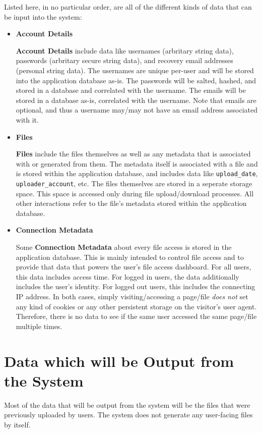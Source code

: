 \documentclass[12pt,a4paper]{report}
\begin{document}
Listed here, in no particular order, are all of the different kinds of data that can be input into the system:
\begin{itemize}
	\item \textbf{Account Details}

	      \textbf{Account Details} include data like usernames (arbritary string data), passwords (arbritary secure string data), and recovery email addresses (personal string data). The usernames are unique per-user and will be stored into the application database as-is. The passwords will be salted, hashed, and stored in a database and correlated with the username. The emails will be stored in a database as-is, correlated with the username. Note that emails are optional, and thus a username may/may not have an email address associated with it.

	\item \textbf{Files}

	      \textbf{Files} include the files themselves as well as any metadata that is associated with or generated from them. The metadata itself is associated with a file and is stored within the application database, and includes data like \texttt{upload\_date}, \texttt{uploader\_account}, etc. The files themselves are stored in a seperate storage space. This space is accessed only during file upload/download processes. All other interactions refer to the file's metadata stored within the application database.

	\item \textbf{Connection Metadata}

	      Some \textbf{Connection Metadata} about every file access is stored in the application database. This is mainly intended to control file access and to provide that data that powers the user's file access dashboard. For all users, this data includes access time. For logged in users, the data additionally includes the user's identity. For logged out users, this includes the connecting IP address. In both cases, simply visiting/accessing a page/file \textit{does not} set any kind of cookies or any other persistent storage on the visitor's user agent. Therefore, there is no data to see if the same user accessed the same page/file multiple times.
\end{itemize}

\section{Data which will be Output from the System}\label{sec:data_which_will_be_output_from_system}
Most of the data that will be output from the system will be the files that were previously uploaded by users. The system does not generate any user-facing files by itself.
\end{document}
